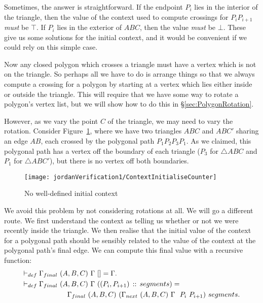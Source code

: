 Sometimes, the answer is straightforward. If the endpoint $P_i$ lies in the interior of the triangle, then the value of the context used to compute crossings for $P_iP_{i+1}$ \emph{must} be $\top$. If $P_i$ lies in the exterior of $ABC$, then the value \emph{must} be $\bot$. These give us some solutions for the initial context, and it would be convenient if we could rely on this simple case.

Now any closed polygon which crosses a triangle must have a vertex which is not on the triangle. So perhaps all we have to do is arrange things so that we always compute a crossing for a polygon by starting at a vertex which lies either inside or outside the triangle. This will require that we have some way to rotate a polygon's vertex list, but we will show how to do this in \S\ref{sec:PolygonRotation}.

However, as we vary the point $C$ of the triangle, we may need to vary the rotation. Consider Figure~\ref{fig:ContextInitialiseCounter}, where we have two triangles $ABC$ and $ABC'$ sharing an edge $AB$, each crossed by the polygonal path $P_1P_2P_3P_1$. As we claimed, this polygonal path has a vertex off the boundary of each triangle ($P_3$ for $\triangle ABC$ and $P_1$ for $\triangle ABC'$), but there is no vertex off both boundaries.

\begin{figure}
\centering\texttt{[image: jordanVerification1/ContextInitialiseCounter]}
\caption{No well-defined initial context}\label{fig:ContextInitialiseCounter}
\end{figure}

We avoid this problem by not considering rotations at all. We will go a different route. We first understand the context as telling us whether or not we were recently inside the triangle. We then realise that the initial value of the context for a polygonal path should be sensibly related to the value of the context at the polygonal path's final edge. We can compute this final value with a recursive function:
\begin{equation*}
\begin{aligned}
\vdash_{def}\;&\Gamma_{final}\ (A,B,C)\ \Gamma\ [] = \Gamma.\\
\vdash_{def}\;&\Gamma_{final}\ (A,B,C)\ \Gamma\ ((P_i,P_{i+1})\,::\,segments) = \\
&\qquad\qquad\Gamma_{final}\ (A,B,C)\ (\Gamma_{next}\ (A,B,C)\ \Gamma\ \ P_i\ P_{i+1})\ segments.
\end{aligned}
\end{equation*}

